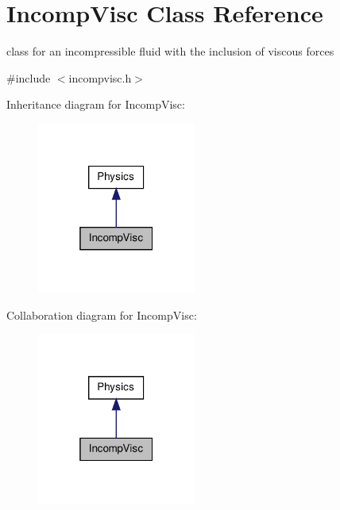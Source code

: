 \hypertarget{classIncompVisc}{\section{\-Incomp\-Visc \-Class \-Reference}
\label{classIncompVisc}
}


class for an incompressible fluid with the inclusion of viscous forces  




{\ttfamily \#include $<$incompvisc.\-h$>$}



\-Inheritance diagram for \-Incomp\-Visc\-:
\nopagebreak
\begin{figure}[H]
\begin{center}
\leavevmode
\includegraphics[width=148pt]{classIncompVisc__inherit__graph}
\end{center}
\end{figure}


\-Collaboration diagram for \-Incomp\-Visc\-:
\nopagebreak
\begin{figure}[H]
\begin{center}
\leavevmode
\includegraphics[width=148pt]{classIncompVisc__coll__graph}
\end{center}
\end{figure}
